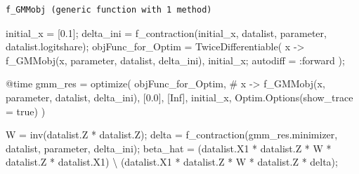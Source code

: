 \documentclass[
  letterpaper,
  DIV=11,
  numbers=noendperiod]{scrreprt}
\newenvironment{Shaded}{\begin{snugshade}}{\end{snugshade}}
\newcommand{\CommentTok}[1]{\textcolor[rgb]{0.37,0.37,0.37}{#1}}
\newcommand{\ConstantTok}[1]{\textcolor[rgb]{0.56,0.35,0.01}{#1}}
\newcommand{\FloatTok}[1]{\textcolor[rgb]{0.68,0.00,0.00}{#1}}
\newcommand{\FunctionTok}[1]{\textcolor[rgb]{0.28,0.35,0.67}{#1}}
\newcommand{\NormalTok}[1]{\textcolor[rgb]{0.00,0.23,0.31}{#1}}
\newcommand{\OperatorTok}[1]{\textcolor[rgb]{0.37,0.37,0.37}{#1}}
\newcommand{\PreprocessorTok}[1]{\textcolor[rgb]{0.68,0.00,0.00}{#1}}
\begin{document}
\begin{verbatim}
f_GMMobj (generic function with 1 method)
\end{verbatim}

\begin{Shaded}
\begin{Highlighting}[]
\NormalTok{initial\_x }\OperatorTok{=}\NormalTok{ [}\FloatTok{0.1}\NormalTok{];}
\NormalTok{delta\_ini }\OperatorTok{=} \FunctionTok{f\_contraction}\NormalTok{(initial\_x, datalist, parameter, datalist.logitshare);}
\NormalTok{objFunc\_for\_Optim }\OperatorTok{=} \FunctionTok{TwiceDifferentiable}\NormalTok{(}
\NormalTok{    x }\OperatorTok{{-}\textgreater{}} \FunctionTok{f\_GMMobj}\NormalTok{(x, parameter, datalist, delta\_ini),}
\NormalTok{    initial\_x;}
\NormalTok{    autodiff }\OperatorTok{=} \OperatorTok{:}\NormalTok{forward}
\NormalTok{    );}
\end{Highlighting}
\end{Shaded}

\begin{Shaded}
\begin{Highlighting}[]
\PreprocessorTok{@time}\NormalTok{ gmm\_res }\OperatorTok{=} \FunctionTok{optimize}\NormalTok{(}
\NormalTok{    objFunc\_for\_Optim,}
\CommentTok{\#     x {-}\textgreater{} f\_GMMobj(x, parameter, datalist, delta\_ini),}
\NormalTok{    [}\FloatTok{0.0}\NormalTok{],}
\NormalTok{    [}\ConstantTok{Inf}\NormalTok{],}
\NormalTok{    initial\_x,}
\NormalTok{    Optim.}\FunctionTok{Options}\NormalTok{(show\_trace }\OperatorTok{=} \ConstantTok{true}\NormalTok{)}
\NormalTok{)}
\end{Highlighting}
\end{Shaded}

\begin{Shaded}
\begin{Highlighting}[]
\NormalTok{W }\OperatorTok{=} \FunctionTok{inv}\NormalTok{(datalist.Z}\OperatorTok{\textquotesingle{}} \OperatorTok{*}\NormalTok{ datalist.Z);    }
\NormalTok{delta }\OperatorTok{=} \FunctionTok{f\_contraction}\NormalTok{(gmm\_res.minimizer, datalist, parameter, delta\_ini);}
\NormalTok{beta\_hat }\OperatorTok{=}\NormalTok{ (datalist.X1}\OperatorTok{\textquotesingle{}} \OperatorTok{*}\NormalTok{ datalist.Z }\OperatorTok{*}\NormalTok{ W }\OperatorTok{*}\NormalTok{ datalist.Z}\OperatorTok{\textquotesingle{}} \OperatorTok{*}\NormalTok{ datalist.X1) }\OperatorTok{\textbackslash{}}\NormalTok{ (datalist.X1}\OperatorTok{\textquotesingle{}} \OperatorTok{*}\NormalTok{ datalist.Z }\OperatorTok{*}\NormalTok{ W }\OperatorTok{*}\NormalTok{ datalist.Z}\OperatorTok{\textquotesingle{}} \OperatorTok{*}\NormalTok{ delta);}
\end{Highlighting}
\end{Shaded}
\end{document}
